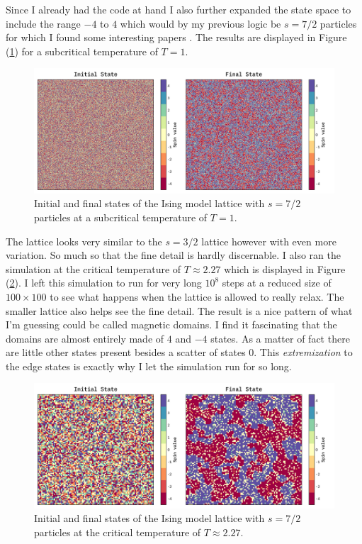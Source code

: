 \documentclass[10pt, titlepage, a4paper]{article}
\begin{document}
Since I already had the code at hand I also further expanded the state space to include the range $-4$ to $4$ which would by my previous 
logic be $s=7/2$ particles for which I found some interesting papers \cite{nano13131995}. The results are displayed in
Figure (\ref{fig:ising-demo-4/2-subcrit}) for a subcritical temperature of $T=1$.

\begin{figure}[H]
    \centering
    \includegraphics[width=.95\textwidth]{../IsingModel/Images/expanded-plus-state-subcritical.png}
    \caption{Initial and final states of the Ising model lattice with $s=7/2$ particles at a subcritical temperature of $T=1$.}
    \label{fig:ising-demo-4/2-subcrit}
\end{figure}

The lattice looks very similar to the $s=3/2$ lattice however with even more variation. So much so that the fine detail is hardly discernable.
I also ran the simulation at the critical temperature of $T\approx 2.27$ which is displayed in Figure (\ref{fig:ising-demo-4/2-critical}). I left 
this simulation to run for very long $10^8$ steps at a reduced size of $100\times 100$ to see what happens when the lattice is allowed to really 
relax. The smaller lattice also helps see the fine detail. The result is a nice pattern of what I'm guessing could be called magnetic domains. I find 
it fascinating that the domains are almost entirely made of $4$ and $-4$ states. As a matter of fact there are little other states present besides 
a scatter of states $0$. This \textit{extremization} to the edge states is exactly why I let the simulation run for so long.

\begin{figure}[H]
    \centering
    \includegraphics[width=.95\textwidth]{../IsingModel/Images/expanded-xlong-state-critical.png}
    \caption{Initial and final states of the Ising model lattice with $s=7/2$ particles at the critical temperature of $T\approx 2.27$.}
    \label{fig:ising-demo-4/2-critical}
\end{figure}
\end{document}
